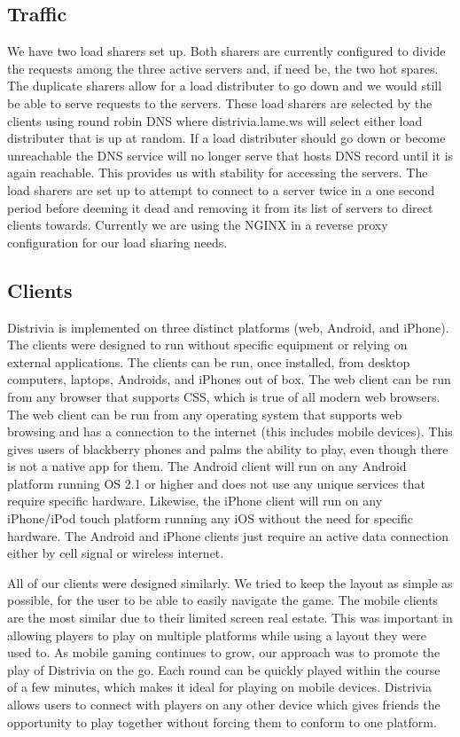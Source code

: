 \documentclass{dependencies/acm_proc_article-sp}
\begin{document}
\subsection{Traffic}
We have two load sharers set up. Both sharers are currently configured to
divide the requests among the three active servers and, if need be, the two hot spares. The duplicate sharers allow
for a load distributer to go down and we would still be able to serve requests
to the servers. These load sharers are selected by the clients using round
robin DNS where distrivia.lame.ws will select either load distributer that is
up at random. If a load distributer should go down or become unreachable the
DNS service will no longer serve that hosts DNS record until it is again
reachable. This provides us with stability for accessing the servers. The
load sharers are set up to attempt to connect to a server twice in a one second
period before deeming it dead and removing it from its list of servers to direct clients towards.
Currently we are using the NGINX \cite{nginx} in a reverse proxy configuration
for our load sharing needs.

\subsection{Clients}
Distrivia is implemented on three distinct platforms (web, Android, and iPhone).
The clients were designed to run without specific equipment or relying on external applications. 
The clients can be run, once installed, from desktop computers, laptops, Androids, and iPhones out of box.
The web client can be run from any browser that supports CSS, which is true of all modern web browsers.
The web client can be run from any operating system that supports web browsing and has a connection to the internet (this includes mobile devices). 
This gives users of blackberry phones and palms the ability to play, even though there is not a native app for them.
The Android client will run on any Android platform running OS 2.1 or higher and does not use any unique services that require specific hardware.
Likewise, the iPhone client will run on any iPhone/iPod touch platform running any iOS without the need for specific hardware.
The Android and iPhone clients just require an active data connection either by cell signal or wireless internet.

All of our clients were designed similarly.
We tried to keep the layout as simple as possible, for the user to be able to easily navigate the game.
The mobile clients are the most similar due to their limited screen real estate.
This was important in allowing players to play on multiple platforms while using a layout they were used to.
As mobile gaming continues to grow, our approach was to promote the play of Distrivia on the go. 
Each round can be quickly played within the course of a few minutes, which makes it ideal for playing on mobile devices.
Distrivia allows users to connect with players on any other device which gives friends the opportunity to play together without forcing them to conform to one platform.
\end{document}
